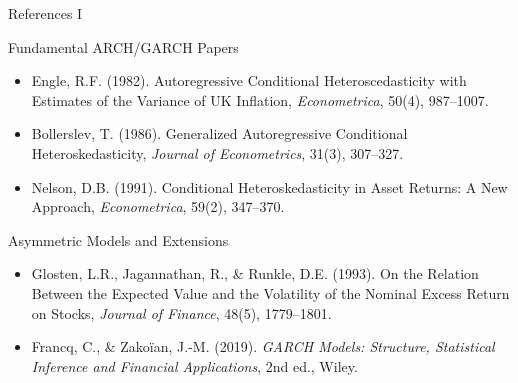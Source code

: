 \documentclass[9pt, aspectratio=169, t]{beamer}
\begin{document}
\begin{frame}{References I}
    \begin{block}{Fundamental ARCH/GARCH Papers}
        {\small
        \begin{itemize}\setlength{\itemsep}{0pt}
            \item Engle, R.F. (1982). Autoregressive Conditional Heteroscedasticity with Estimates of the Variance of UK Inflation, \textit{Econometrica}, 50(4), 987--1007.
            \item Bollerslev, T. (1986). Generalized Autoregressive Conditional Heteroskedasticity, \textit{Journal of Econometrics}, 31(3), 307--327.
            \item Nelson, D.B. (1991). Conditional Heteroskedasticity in Asset Returns: A New Approach, \textit{Econometrica}, 59(2), 347--370.
        \end{itemize}
        }
    \end{block}

    \begin{exampleblock}{Asymmetric Models and Extensions}
        {\small
        \begin{itemize}\setlength{\itemsep}{0pt}
            \item Glosten, L.R., Jagannathan, R., \& Runkle, D.E. (1993). On the Relation Between the Expected Value and the Volatility of the Nominal Excess Return on Stocks, \textit{Journal of Finance}, 48(5), 1779--1801.
            \item Francq, C., \& Zakoïan, J.-M. (2019). \textit{GARCH Models: Structure, Statistical Inference and Financial Applications}, 2nd ed., Wiley.
        \end{itemize}
        }
    \end{exampleblock}
\end{frame}
\end{document}
